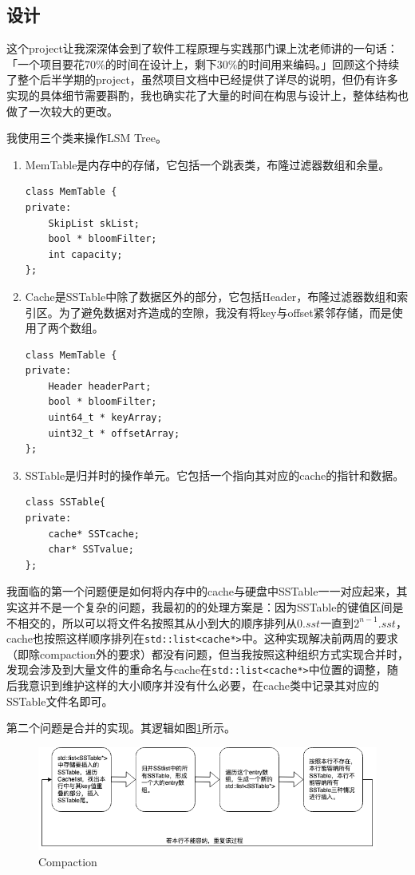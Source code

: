 \documentclass[fontset=windows]{article}
\begin{document}
\subsection{设计}
这个project让我深深体会到了软件工程原理与实践那门课上沈老师讲的一句话：「一个项目要花70\%的时间在设计上，剩下30\%的时间用来编码。」回顾这个持续了整个后半学期的project，虽然项目文档中已经提供了详尽的说明，但仍有许多实现的具体细节需要斟酌，我也确实花了大量的时间在构思与设计上，整体结构也做了一次较大的更改。

我使用三个类来操作LSM Tree。
\begin{enumerate}
\item MemTable是内存中的存储，它包括一个跳表类，布隆过滤器数组和余量。
\begin{lstlisting}
class MemTable {
private:
    SkipList skList;
    bool * bloomFilter;
    int capacity;
};
\end{lstlisting}
\item Cache是SSTable中除了数据区外的部分，它包括Header，布隆过滤器数组和索引区。为了避免数据对齐造成的空隙，我没有将key与offset紧邻存储，而是使用了两个数组。
\begin{lstlisting}
class MemTable {
private:
    Header headerPart;
    bool * bloomFilter;
    uint64_t * keyArray;
    uint32_t * offsetArray;
};
\end{lstlisting}
\item SSTable是归并时的操作单元。它包括一个指向其对应的cache的指针和数据。
\begin{lstlisting}
class SSTable{
private:
    cache* SSTcache;
    char* SSTvalue;
};
\end{lstlisting}
\end{enumerate}

我面临的第一个问题便是如何将内存中的cache与硬盘中SSTable一一对应起来，其实这并不是一个复杂的问题，我最初的的处理方案是：因为SSTable的键值区间是不相交的，所以可以将文件名按照其从小到大的顺序排列从$0.sst$一直到$2^{n-1}.sst$，cache也按照这样顺序排列在\verb|std::list<cache*>|中。这种实现解决前两周的要求（即除compaction外的要求）都没有问题，但当我按照这种组织方式实现合并时，发现会涉及到大量文件的重命名与cache在\verb|std::list<cache*>|中位置的调整，随后我意识到维护这样的大小顺序并没有什么必要，在cache类中记录其对应的SSTable文件名即可。

第二个问题是合并的实现。其逻辑如图\ref{fig:compaction}所示。
\begin{figure}[h]
\centering
\includegraphics[width=1\textwidth]{img/campaction.png}
\caption{Compaction}
\label{fig:compaction}
\end{figure}
\end{document}
